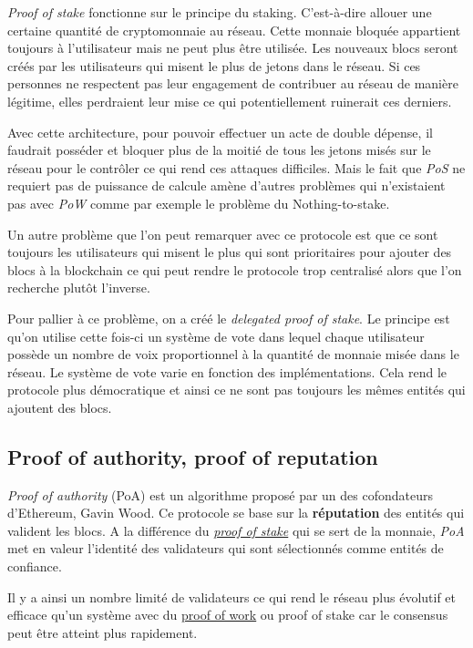 \textit{Proof of stake} fonctionne sur le principe du staking. C'est-à-dire allouer une certaine quantité de cryptomonnaie au réseau. Cette monnaie bloquée appartient toujours à l'utilisateur mais ne peut plus être utilisée. Les nouveaux blocs seront créés par les utilisateurs qui misent le plus de jetons dans le réseau. Si ces personnes ne respectent pas leur engagement de contribuer au réseau de manière légitime, elles perdraient leur mise ce qui potentiellement ruinerait ces derniers. 

Avec cette architecture, pour pouvoir effectuer un acte de double dépense, il faudrait posséder et bloquer plus de la moitié de tous les jetons misés sur le réseau pour le contrôler ce qui rend ces attaques difficiles. Mais le fait que \textit{PoS} ne requiert pas de puissance de calcule amène d'autres problèmes qui n'existaient pas avec \textit{PoW} comme par exemple le problème du Nothing-to-stake.

Un autre problème que l'on peut remarquer avec ce protocole est que ce sont toujours les utilisateurs qui misent le plus qui sont prioritaires pour ajouter des blocs à la blockchain ce qui peut rendre le protocole trop centralisé alors que l'on recherche plutôt l'inverse.

Pour pallier à ce problème, on a créé le \textit{delegated proof of stake}. Le principe est qu'on utilise cette fois-ci un système de vote dans lequel chaque utilisateur possède un nombre de voix proportionnel à la quantité de monnaie misée dans le réseau. Le système de vote varie en fonction des implémentations. Cela rend le protocole plus démocratique et ainsi ce ne sont pas toujours les mêmes entités qui ajoutent des blocs.

\subsection{Proof of authority, proof of reputation}
\label{consensus:poa}

\emph{Proof of authority} (PoA) est un algorithme proposé par un des cofondateurs d'Ethereum, Gavin Wood. Ce protocole se base sur la \textbf{réputation} des entités qui valident les blocs. A la différence du \hyperref[consensus:pos]{\emph{proof of stake}} qui se sert de la monnaie, \emph{PoA} met en valeur l'identité des validateurs qui sont sélectionnés comme entités de confiance.

Il y a ainsi un nombre limité de validateurs ce qui rend le réseau plus évolutif et efficace qu'un système avec du \hyperref[consensus:pow]{proof of work} ou proof of stake car le consensus peut être atteint plus rapidement.

